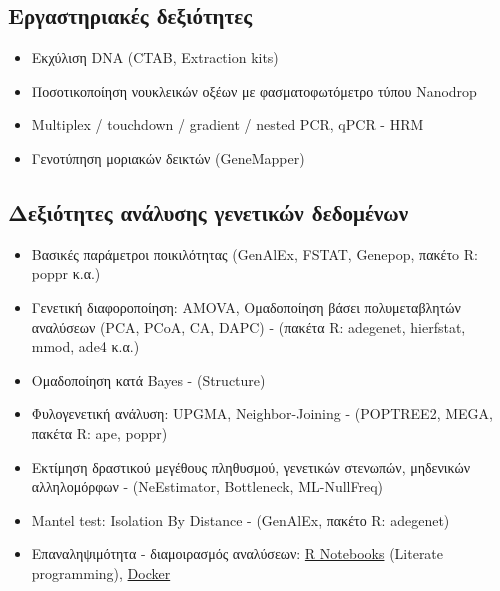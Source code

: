 \documentclass[12pt,]{scrartcl}
\begin{document}
\subsection{Εργαστηριακές δεξιότητες}\label{lab}
\begin{itemize}
\vspace{-3mm}
\setlength\itemsep{-0.6em}
\item Εκχύλιση DNA (CTAB, Extraction kits)
\item Ποσοτικοποίηση νουκλεικών οξέων με φασματοφωτόμετρο τύπου Nanodrop
\item Multiplex / touchdown / gradient / nested PCR, qPCR - HRM
\item Γενοτύπηση μοριακών δεικτών (GeneMapper)
\end{itemize}

\subsection{Δεξιότητες ανάλυσης γενετικών δεδομένων}\label{genetics}
\begin{itemize}
\vspace{-3mm}
\setlength\itemsep{-0.6em}
\item Βασικές παράμετροι ποικιλότητας (GenAlEx, FSTAT, Genepop, πακέτo R: poppr κ.α.)
\item Γενετική διαφοροποίηση: AMOVA, Ομαδοποίηση βάσει πολυμεταβλητών αναλύσεων (PCA, PCoA, CA, DAPC) - (πακέτα R: adegenet, hierfstat, mmod, ade4 κ.α.)
\item Ομαδοποίηση κατά Bayes - (Structure)
\item Φυλογενετική ανάλυση: UPGMA, Neighbor-Joining - (POPTREE2, MEGA, πακέτα R: ape, poppr)
\item Εκτίμηση δραστικού μεγέθους πληθυσμού, γενετικών στενωπών, μηδενικών αλληλομόρφων - (NeEstimator, Bottleneck, ML-NullFreq)
\item Mantel test: Isolation By Distance - (GenAlEx, πακέτο R: adegenet)
\item Επαναληψιμότητα - διαμοιρασμός αναλύσεων: \href{https://bookdown.org/yihui/rmarkdown/notebook.html}
{R Notebooks} (Literate programming), \href{https://www.docker.com/}{Docker}
\end{itemize}
\end{document}
